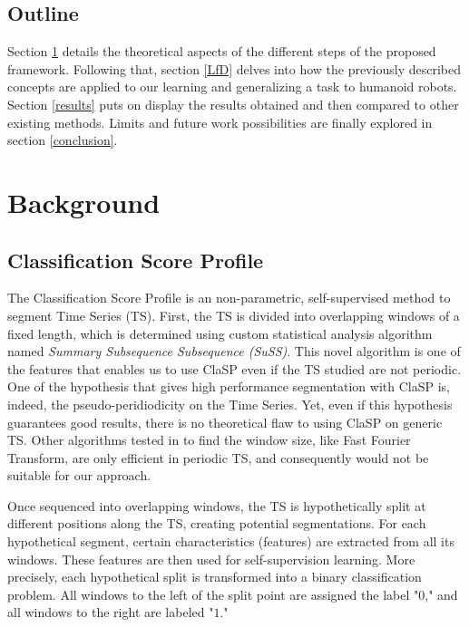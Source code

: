 \documentclass[conference]{IEEEtran}
\begin{document}
\subsection{Outline}

Section \ref{Background} details the theoretical aspects of the different steps of the proposed framework. Following that, section \ref{LfD} delves into how the previously described concepts are applied to our learning and generalizing a task to humanoid robots. Section \ref{results} puts on display the results obtained and then compared to other existing methods. Limits and future work possibilities are finally explored in section \ref{conclusion}.


\section{Background} \label{Background}

\subsection{Classification Score Profile}

The Classification Score Profile is an non-parametric, self-supervised method to segment Time Series (TS). First, the TS is divided into overlapping windows of a fixed length, which is determined using custom statistical analysis algorithm named \textit{Summary  Subsequence Subsequence (SuSS)}. This novel algorithm is one of the features that enables us to use ClaSP even if the TS studied are not periodic. One of the hypothesis that gives high performance segmentation with ClaSP is, indeed, the pseudo-peridiodicity on the Time Series. Yet, even if this hypothesis guarantees good results, there is no theoretical flaw to using ClaSP on generic TS. Other algorithms tested in \cite{clasp} to find the window size, like Fast Fourier Transform, are only efficient in periodic TS, and consequently would not be suitable for our approach.


Once sequenced into overlapping windows, the TS is hypothetically split at different positions along the TS, creating potential segmentations. For each hypothetical segment, certain characteristics (features) are extracted from all its windows. These features are then used for self-supervision learning.
More precisely, each hypothetical split is transformed into a binary classification problem. All windows to the left of the split point are assigned the label "$0$," and all windows to the right are labeled "$1$."
\end{document}

